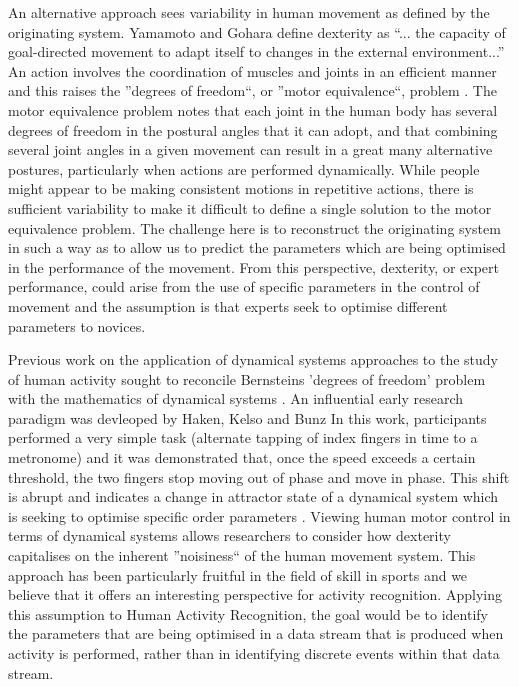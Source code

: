 \documentclass{sigchi}
\begin{document}
An alternative approach sees variability in human movement as defined by the originating system. 
Yamamoto and Gohara \cite{Yamamoto2000} define dexterity as ``... the capacity of goal-directed movement 
to adapt itself to changes in the external environment...”  An action involves the coordination of muscles and 
joints in an efficient manner and this raises the ''degrees of freedom``, or ''motor equivalence``, 
problem \cite{Bernstein1967}. 
The motor equivalence problem notes that each joint in the human body has several degrees of freedom in 
the postural angles that it can adopt, and that combining several joint angles in a given movement can 
result in a great many alternative postures, particularly when actions are performed dynamically. 
While people might appear to be making consistent motions in repetitive actions, there is sufficient 
variability to make it difficult to define a single solution to the motor equivalence problem. 
The challenge here is to reconstruct the originating system in such a way as to allow us to predict 
the parameters which are being optimised in the performance of the movement. From this perspective, dexterity, 
or expert performance, could arise from the use of specific parameters in the control of movement and 
the assumption is that experts seek to optimise different parameters to novices. 
 

Previous work on the application of dynamical systems approaches to the study of human activity sought to 
reconcile Bernsteins  \cite{Bernstein1967} 'degrees of freedom' problem with the mathematics 
of dynamical systems \cite{Kugler1982}.
An influential early research paradigm was devleoped by Haken, Kelso and Bunz \cite{Haken1985}
In this work, participants performed a very simple task (alternate tapping of index fingers in time to a metronome) 
and it was demonstrated that, once the speed exceeds a certain threshold, the two fingers stop moving out of 
phase and move in phase. This shift is abrupt and indicates a change in attractor state of a dynamical 
system which is seeking to optimise specific order parameters  \cite{Beek1995, RefXXX}.
Viewing human motor control in terms of 
dynamical systems allows researchers to consider how dexterity capitalises on the inherent ''noisiness`` of the human 
movement system. This approach has been particularly fruitful in the field of skill in sports \cite{Davids2003}
and we believe that it offers an interesting perspective for activity recognition. 
Applying this assumption to Human Activity Recognition, the goal would be to identify the parameters that are being 
optimised in a data stream that is produced when activity is performed, rather than in identifying 
discrete events within that data stream. 
 
\end{document}
